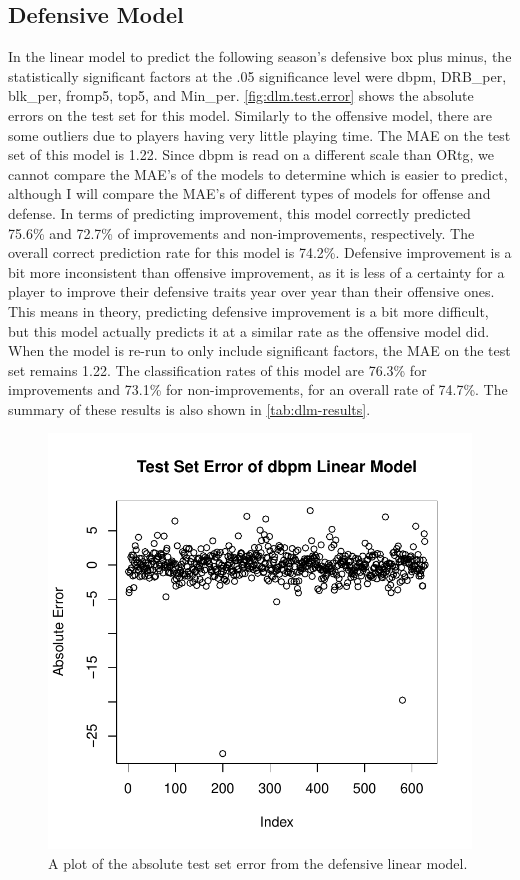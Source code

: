 \documentclass[12pt]{article}
\begin{document}
\subsection{Defensive Model}
\label{subsec:dlm}
In the linear model to predict the following season's defensive box plus minus, the statistically significant factors at the .05 significance level were dbpm, DRB\_per, blk\_per, fromp5, top5, and Min\_per. \autoref{fig:dlm.test.error} shows the absolute errors on the test set for this model. Similarly to the offensive model, there are some outliers due to players having very little playing time. The MAE on the test set of this model is 1.22. Since dbpm is read on a different scale than ORtg, we cannot compare the MAE's of the models to determine which is easier to predict, although I will compare the MAE's of different types of models for offense and defense. In terms of predicting improvement, this model correctly predicted 75.6\% and 72.7\% of improvements and non-improvements, respectively. The overall correct prediction rate for this model is 74.2\%. Defensive improvement is a bit more inconsistent than offensive improvement, as it is less of a certainty for a player to improve their defensive traits year over year than their offensive ones. This means in theory, predicting defensive improvement is a bit more difficult, but this model actually predicts it at a similar rate as the offensive model did. When the model is re-run to only include significant factors, the MAE on the test set remains 1.22. The classification rates of this model are 76.3\% for improvements and 73.1\% for non-improvements, for an overall rate of 74.7\%. The summary of these results is also shown in \autoref{tab:dlm-results}.


\begin{figure}[tbp]
	\centering
	\includegraphics[width=\textwidth]{dlm.test.error}
	\caption{A plot of the absolute test set error from the defensive linear model.}
	\label{fig:dlm.test.error}
\end{figure}
\end{document}
